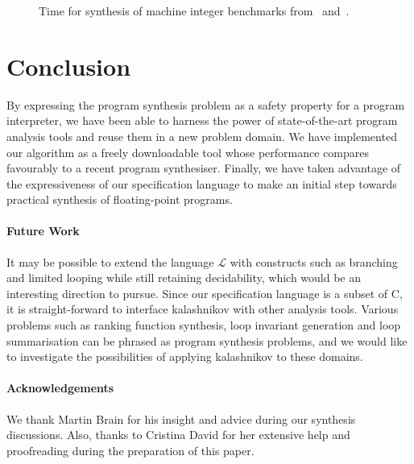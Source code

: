 \begin{figure}[ht]
\centering
{\tiny

}
\caption{Time for synthesis of machine integer benchmarks from~\cite{brahma} and~\cite{brahma-icse}.
 \label{fig:results-table}}
\end{figure}

%



\section{Conclusion}

By expressing the program synthesis problem as a safety property for a
program interpreter, we have been able to harness the power of
state-of-the-art program analysis tools and reuse them in a new problem
domain.  We have implemented our algorithm as a freely downloadable tool
whose performance compares favourably to a recent program synthesiser. 
Finally, we have taken advantage of the expressiveness of our specification
language to make an initial step towards practical synthesis of
floating-point programs.

\paragraph{Future Work}

It may be possible to extend the language $\mathcal{L}$ with constructs such
as branching and limited looping while still retaining decidability, which
would be an interesting direction to pursue.  Since our specification
language is a subset of C, it is straight-forward to interface {\sc
kalashnikov} with other analysis tools.  Various problems such as ranking
function synthesis, loop invariant generation and loop
summarisation can be phrased as program synthesis problems, and we would like to investigate the
possibilities of applying {\sc kalashnikov} to these domains.

\paragraph{Acknowledgements}
We thank Martin Brain for his insight and advice during our synthesis discussions.
Also, thanks to Cristina David for her extensive help and proofreading during the
preparation of this paper.

